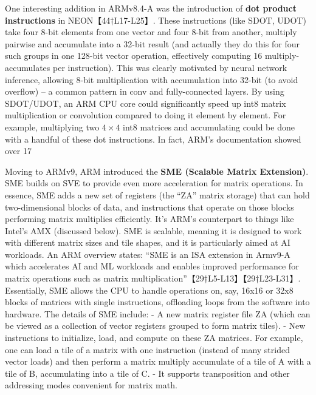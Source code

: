 One interesting addition in ARMv8.4-A was the introduction of \textbf{dot product instructions} in NEON【44†L17-L25】. These instructions (like SDOT, UDOT) take four 8-bit elements from one vector and four 8-bit from another, multiply pairwise and accumulate into a 32-bit result (and actually they do this for four such groups in one 128-bit vector operation, effectively computing 16 multiply-accumulates per instruction). This was clearly motivated by neural network inference, allowing 8-bit multiplication with accumulation into 32-bit (to avoid overflow) – a common pattern in conv and fully-connected layers. By using SDOT/UDOT, an ARM CPU core could significantly speed up int8 matrix multiplication or convolution compared to doing it element by element. For example, multiplying two $4\times4$ int8 matrices and accumulating could be done with a handful of these dot instructions. In fact, ARM’s documentation showed over 17%

Moving to ARMv9, ARM introduced the \textbf{SME (Scalable Matrix Extension)}. SME builds on SVE to provide even more acceleration for matrix operations. In essence, SME adds a new set of registers (the “ZA” matrix storage) that can hold two-dimensional blocks of data, and instructions that operate on those blocks performing matrix multiplies efficiently. It’s ARM’s counterpart to things like Intel’s AMX (discussed below). SME is scalable, meaning it is designed to work with different matrix sizes and tile shapes, and it is particularly aimed at AI workloads. An ARM overview states: “SME is an ISA extension in Armv9-A which accelerates AI and ML workloads and enables improved performance for matrix operations such as matrix multiplication”【29†L5-L13】【29†L23-L31】. Essentially, SME allows the CPU to handle operations on, say, 16x16 or 32x8 blocks of matrices with single instructions, offloading loops from the software into hardware. The details of SME include:
- A new matrix register file ZA (which can be viewed as a collection of vector registers grouped to form matrix tiles).
- New instructions to initialize, load, and compute on these ZA matrices. For example, one can load a tile of a matrix with one instruction (instead of many strided vector loads) and then perform a matrix multiply accumulate of a tile of A with a tile of B, accumulating into a tile of C.
- It supports transposition and other addressing modes convenient for matrix math.

